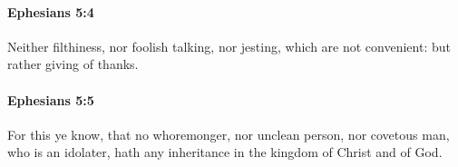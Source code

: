 		\paragraph{Ephesians 5:4} %
			\label{EPHESIANS-5-4}

			Neither filthiness, nor foolish talking, nor jesting, which are not convenient: but rather giving of thanks.

			\begin{framed}
			\scriptsize
				\begin{compactdesc}
					\item[SBLG] 
				\end{compactdesc}
			\end{framed}

		\paragraph{Ephesians 5:5} %
			\label{EPHESIANS-5-5}

			For this ye know, that no whoremonger, nor unclean person, nor covetous man, who is an idolater, hath any inheritance in the kingdom of Christ and of God.

